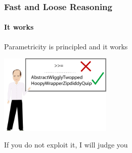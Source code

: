 \begin{frame}[fragile]
\frametitle{Fast and Loose Reasoning}
\framesubtitle{It works}
\begin{center}
Parametricity is principled and it works
\end{center}
\begin{center}
\includegraphics[height=3.8cm]{image/AbstractWigglyTwoppedHoopyWrapperZipdiddyQuip.png}
\end{center}
\begin{center}
If you do not exploit it, I will judge you
\end{center}
\end{frame}
